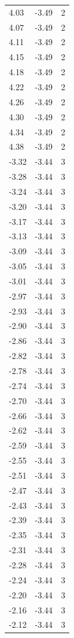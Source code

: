 \begin{longtable}{lrr}
  4.03 & -3.49 & 2 \\
  4.07 & -3.49 & 2 \\
  4.11 & -3.49 & 2 \\
  4.15 & -3.49 & 2 \\
  4.18 & -3.49 & 2 \\
  4.22 & -3.49 & 2 \\
  4.26 & -3.49 & 2 \\
  4.30 & -3.49 & 2 \\
  4.34 & -3.49 & 2 \\
  4.38 & -3.49 & 2 \\
  -3.32 & -3.44 & 3 \\
  -3.28 & -3.44 & 3 \\
  -3.24 & -3.44 & 3 \\
  -3.20 & -3.44 & 3 \\
  -3.17 & -3.44 & 3 \\
  -3.13 & -3.44 & 3 \\
  -3.09 & -3.44 & 3 \\
  -3.05 & -3.44 & 3 \\
  -3.01 & -3.44 & 3 \\
  -2.97 & -3.44 & 3 \\
  -2.93 & -3.44 & 3 \\
  -2.90 & -3.44 & 3 \\
  -2.86 & -3.44 & 3 \\
  -2.82 & -3.44 & 3 \\
  -2.78 & -3.44 & 3 \\
  -2.74 & -3.44 & 3 \\
  -2.70 & -3.44 & 3 \\
  -2.66 & -3.44 & 3 \\
  -2.62 & -3.44 & 3 \\
  -2.59 & -3.44 & 3 \\
  -2.55 & -3.44 & 3 \\
  -2.51 & -3.44 & 3 \\
  -2.47 & -3.44 & 3 \\
  -2.43 & -3.44 & 3 \\
  -2.39 & -3.44 & 3 \\
  -2.35 & -3.44 & 3 \\
  -2.31 & -3.44 & 3 \\
  -2.28 & -3.44 & 3 \\
  -2.24 & -3.44 & 3 \\
  -2.20 & -3.44 & 3 \\
  -2.16 & -3.44 & 3 \\
  -2.12 & -3.44 & 3 \\

\end{longtable}
